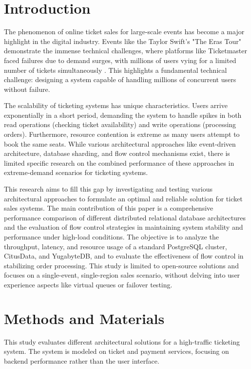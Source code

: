 \section{Introduction}
\label{sec:introduction}

The phenomenon of online ticket sales for large-scale events has become a major highlight in the digital industry. Events like the Taylor Swift's "The Eras Tour" demonstrate the immense technical challenges, where platforms like Ticketmaster faced failures due to demand surges, with millions of users vying for a limited number of tickets simultaneously \cite{swiftTicketmaster}. This highlights a fundamental technical challenge: designing a system capable of handling millions of concurrent users without failure.

The scalability of ticketing systems has unique characteristics. Users arrive exponentially in a short period, demanding the system to handle spikes in both read operations (checking ticket availability) and write operations (processing orders). Furthermore, resource contention is extreme as many users attempt to book the same seats. While various architectural approaches like event-driven architecture, database sharding, and flow control mechanisms exist, there is limited specific research on the combined performance of these approaches in extreme-demand scenarios for ticketing systems.

This research aims to fill this gap by investigating and testing various architectural approaches to formulate an optimal and reliable solution for ticket sales systems. The main contribution of this paper is a comprehensive performance comparison of different distributed relational database architectures and the evaluation of flow control strategies in maintaining system stability and performance under high-load conditions. The objective is to analyze the throughput, latency, and resource usage of a standard PostgreSQL cluster, CitusData, and YugabyteDB, and to evaluate the effectiveness of flow control in stabilizing order processing. This study is limited to open-source solutions and focuses on a single-event, single-region sales scenario, without delving into user experience aspects like virtual queues or failover testing.

\section{Methods and Materials}
\label{sec:methods}
This study evaluates different architectural solutions for a high-traffic ticketing system. The system is modeled on ticket and payment services, focusing on backend performance rather than the user interface.

